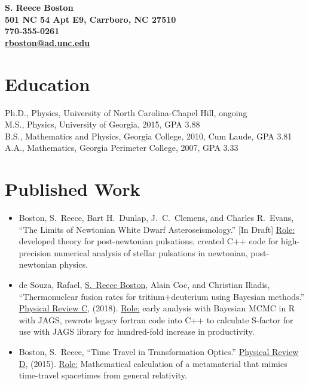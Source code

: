 \documentclass[11pt]{article}
\begin{document}
\begin{center}
 {\bf S. Reece Boston}\\
 {\bf 501 NC 54 Apt E9, Carrboro, NC 27510}\\
 {\bf 770-355-0261}\\
 {\bf \href{mailto:rboston@ad.unc.edu}{rboston@ad.unc.edu}}
\end{center}

\section*{Education}
\begin{minipage}{\textwidth}
	\begin{description}
		\item[Ph.D., Physics, University of North Carolina-Chapel Hill, ongoing]
		\item[M.S., Physics, University of Georgia, 2015, GPA 3.88]
		\item[B.S., Mathematics and Physics, Georgia College, 2010, Cum Laude, GPA  3.81]
		\item[A.A., Mathematics, Georgia Perimeter College, 2007, GPA 3.33]
	\end{description}
\end{minipage}

\section*{Published Work}
	\begin{itemize}
		\item Boston, S.~Reece, Bart H.~Dunlap, J.~C.~Clemens, and Charles R.~Evans, ``The Limits of Newtonian White Dwarf Asteroseismology.'' [In Draft]\newline
		\underline{Role:} developed theory for post-newtonian pulsations, created C++ code for high-precision numerical analysis of stellar pulsations in newtonian, post-newtonian physics.
		\item de Souza, Rafael, \underline{S.~Reece Boston}, Alain Coc, and Christian Iliadis, ``Thermonuclear fusion rates for tritium+deuterium using Bayesian methods.''  \href{http://journals.aps.org/prc/abstract/10.1103/PhysRevC.99.014619}{Physical Review C}, (2018).\newline
		\underline{Role:} early analysis with Bayesian MCMC in R with JAGS, rewrote legacy fortran code into C++ to calculate S-factor for use with JAGS library for hundred-fold increase in productivity.
		\item Boston, S.~Reece, ``Time Travel in Transformation Optics.''  \href{http://journals.aps.org/prd/abstract/10.1103/PhysRevD.91.124035}{Physical Review D}, (2015).\newline
		\underline{Role:} Mathematical calculation of a metamaterial that mimics time-travel spacetimes from general relativity.
	\end{itemize}
\end{document}

